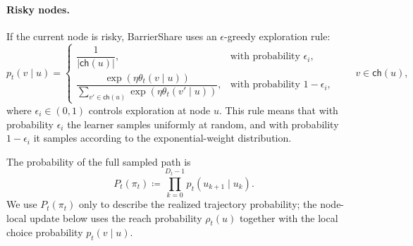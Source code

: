 \documentclass{article}
\begin{document}
\paragraph{Risky nodes.}
If the current node is risky, BarrierShare uses an $\epsilon$-greedy exploration rule:
\begin{equation}
    p_t(v\mid u)
    =
    \begin{cases}
    \dfrac{1}{|\mathsf{ch}(u)|}, & \text{with probability } \epsilon_i, \\[8pt]
    \dfrac{\exp(\eta \theta_t(v\mid u))}{\sum_{v' \in \mathsf{ch}(u)} \exp(\eta \theta_t(v'\mid u))}, & \text{with probability } 1-\epsilon_i,
    \end{cases}
    \qquad v \in \mathsf{ch}(u),
    \label{eq:risky_selection}
\end{equation}
where $\epsilon_i \in (0,1)$ controls exploration at node $u$. This rule means that with probability $\epsilon_i$ the learner samples uniformly at random, and with probability $1-\epsilon_i$ it samples according to the exponential-weight distribution.

The probability of the full sampled path is
\begin{equation}
    P_t(\pi_t) \coloneqq \prod_{k=0}^{D_t-1} p_t(u_{k+1}\mid u_k).
    \label{eq:path_prob}
\end{equation}
We use $P_t(\pi_t)$ only to describe the realized trajectory probability; the node-local update below uses the reach probability $\rho_t(u)$ together with the local choice probability $p_t(v\mid u)$.
\end{document}
